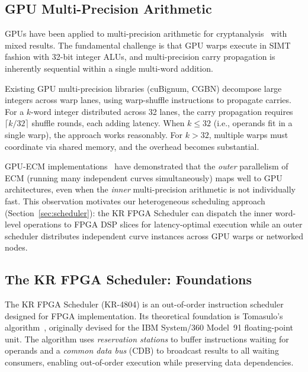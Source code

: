 \documentclass[11pt,a4paper]{article}
\begin{document}
\subsection{GPU Multi-Precision Arithmetic}
\label{sec:gpu-mp}

GPUs have been applied to multi-precision arithmetic for
cryptanalysis~\cite{emmart2018,zheng2014,miele2014,zimmermann2010gpuecm}
with mixed results.  The fundamental challenge is that GPU warps execute
in SIMT fashion with 32-bit integer ALUs, and multi-precision carry
propagation is inherently sequential within a single multi-word addition.

Existing GPU multi-precision libraries (cuBignum, CGBN) decompose large
integers across warp lanes, using warp-shuffle instructions to propagate
carries.  For a $k$-word integer distributed across 32 lanes, the carry
propagation requires $\lceil k/32 \rceil$ shuffle rounds, each adding
latency.  When $k \leq 32$ (i.e., operands fit in a single warp), the
approach works reasonably.  For $k > 32$, multiple warps must coordinate
via shared memory, and the overhead becomes substantial.

GPU-ECM implementations~\cite{zimmermann2010gpuecm} have demonstrated
that the \emph{outer} parallelism of ECM (running many independent curves
simultaneously) maps well to GPU architectures, even when the \emph{inner}
multi-precision arithmetic is not individually fast.  This observation
motivates our heterogeneous scheduling approach (Section~\ref{sec:scheduler}):
the KR FPGA Scheduler can dispatch the inner word-level operations to FPGA
DSP slices for latency-optimal execution while an outer scheduler distributes
independent curve instances across GPU warps or networked nodes.

\subsection{The KR FPGA Scheduler: Foundations}
\label{sec:scheduler-background}

The KR FPGA Scheduler (KR-4804) is an out-of-order instruction scheduler
designed for FPGA implementation.  Its theoretical foundation is Tomasulo's
algorithm~\cite{tomasulo1967}, originally devised for the IBM System/360
Model~91 floating-point unit.  The algorithm uses \emph{reservation stations}
to buffer instructions waiting for operands and a \emph{common data bus} (CDB)
to broadcast results to all waiting consumers, enabling out-of-order execution
while preserving data dependencies.
\end{document}
